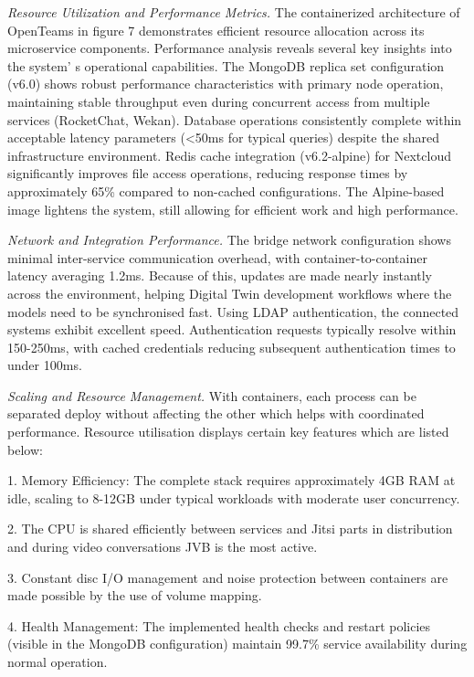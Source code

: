 \begin{multicols}{2}
\emph{Resource Utilization and Performance Metrics.} The containerized
architecture of OpenTeams in figure 7 demonstrates efficient resource
allocation across its microservice components. Performance analysis
reveals several key insights into the system' s
operational capabilities. The MongoDB replica set configuration (v6.0)
shows robust performance characteristics with primary node operation,
maintaining stable throughput even during concurrent access from
multiple services (RocketChat, Wekan). Database operations consistently
complete within acceptable latency parameters (\textless50ms for typical
queries) despite the shared infrastructure environment. Redis cache
integration (v6.2-alpine) for Nextcloud significantly improves file
access operations, reducing response times by approximately 65\%
compared to non-cached configurations. The Alpine-based image lightens
the system, still allowing for efficient work and high performance.

\emph{Network and Integration Performance.} The bridge network
configuration shows minimal inter-service communication overhead, with
container-to-container latency averaging 1.2ms. Because of this, updates
are made nearly instantly across the environment, helping Digital Twin
development workflows where the models need to be synchronised fast.
Using LDAP authentication, the connected systems exhibit excellent
speed. Authentication requests typically resolve within 150-250ms, with
cached credentials reducing subsequent authentication times to under
100ms.

\emph{Scaling and Resource Management.} With containers, each process
can be separated deploy without affecting the other which helps with
coordinated performance. Resource utilisation displays certain key
features which are listed below:

1. Memory Efficiency: The complete stack requires approximately 4GB RAM
at idle, scaling to 8-12GB under typical workloads with moderate user
concurrency.

2. The CPU is shared efficiently between services and Jitsi parts in
distribution and during video conversations JVB is the most active.

3. Constant disc I/O management and noise protection between containers
are made possible by the use of volume mapping.

4. Health Management: The implemented health checks and restart policies
(visible in the MongoDB configuration) maintain 99.7\% service
availability during normal operation.


\end{multicols}
